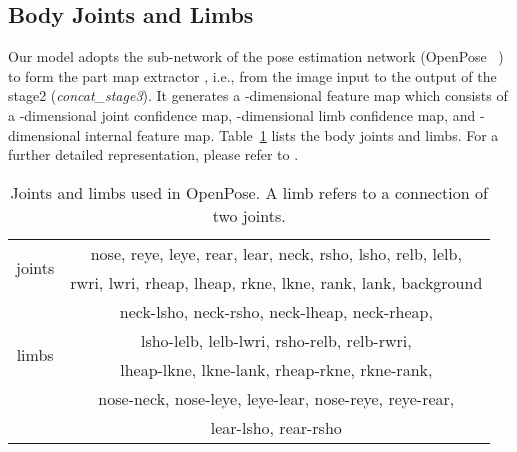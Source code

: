 \documentclass{llncs}
\begin{document}
\subsection{Body Joints and Limbs}
Our model adopts the sub-network of the pose estimation network (OpenPose~\cite{conf/cvpr/cao17} ) to form the part map extractor , i.e., from the image input to the output of the stage2 ({\it concat\_stage3}). It generates a -dimensional feature map which consists of a -dimensional joint confidence map, -dimensional limb confidence map, and -dimensional internal feature map. Table~\ref{table:body_part} lists the body joints and limbs. For a further detailed representation, please refer to \cite{conf/cvpr/cao17}.



\begin{table}[t]
\fontsize{9}{9}\selectfont
\begin{center}
\centering
\caption{Joints and limbs used in OpenPose.
A limb refers to a connection of two joints.
}\vspace{-.3cm}
\label{table:body_part}
\begin{tabular}[pos]{|c |c|}
\hline
\multirow{2}{*}{joints} & nose, reye, leye, rear, lear, neck, rsho, lsho, relb, lelb, \\
& rwri, lwri, rheap, lheap, rkne, lkne, rank, lank, background\\ \hline
\multirow{4}{*}{limbs} & neck-lsho, neck-rsho, neck-lheap, neck-rheap,\\
& lsho-lelb, lelb-lwri, rsho-relb, relb-rwri,  \\
& lheap-lkne, lkne-lank, rheap-rkne, rkne-rank,\\
& nose-neck, nose-leye, leye-lear, nose-reye, reye-rear, \\
& lear-lsho, rear-rsho\\ \hline
\end{tabular}
 \vspace{-0.5cm}
\end{center}
\end{table}
\end{document}

